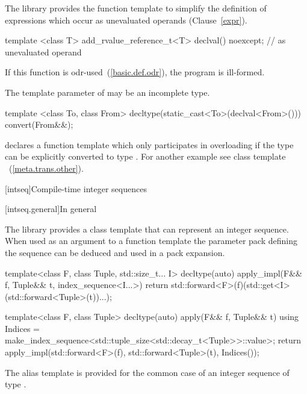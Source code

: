 \pnum
The library provides the function template  to simplify the definition of
expressions which occur as unevaluated operands (Clause~\ref{expr}).

%
\begin{itemdecl}
template <class T>
  add_rvalue_reference_t<T> declval() noexcept;  // as unevaluated operand
\end{itemdecl}

\begin{itemdescr}
\pnum
\remarks If this function is odr-used~(\ref{basic.def.odr}), the program is ill-formed.

\pnum
\remarks The template parameter  of  may be an incomplete type.

\enterexample
\begin{codeblock}
template <class To, class From>
  decltype(static_cast<To>(declval<From>())) convert(From&&);
\end{codeblock}

declares a function template  which only participates in overloading if the
type  can be explicitly converted to type . For another example see class
template ~(\ref{meta.trans.other}).
\exitexample
\end{itemdescr}

[intseq]{Compile-time integer sequences}

[intseq.general]{In general}

\pnum
The library provides a class template that can represent an integer sequence.
When used as an argument to a function template the parameter pack defining the
sequence can be deduced and used in a pack expansion.

\pnum
\enterexample

\begin{codeblock}
template<class F, class Tuple, std::size_t... I>
  decltype(auto) apply_impl(F&& f, Tuple&& t, index_sequence<I...>) {
    return std::forward<F>(f)(std::get<I>(std::forward<Tuple>(t))...);
  }

template<class F, class Tuple>
  decltype(auto) apply(F&& f, Tuple&& t) {
    using Indices = make_index_sequence<std::tuple_size<std::decay_t<Tuple>>::value>;
    return apply_impl(std::forward<F>(f), std::forward<Tuple>(t), Indices());
  }
\end{codeblock}

\exitexample
\enternote
The  alias template is provided for the common case of
an integer sequence of type .
\exitnote

